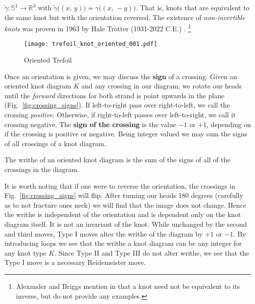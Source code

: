     $\tilde{\gamma}:\mathbb{S}^{1}\rightarrow\mathbb{R}^{3}$ with
    $\tilde{\gamma}\big((x,\,y)\big)=\gamma\big((x,\,-y)\big)$. That is,
    knots that are equivalent to the same knot but with the orientation
    reversed. The existence of \textit{non-invertible knots} was proven in
    1963 by Hale Trotter (1931-2022 C.E.) \cite{TrotterInvertibleKnots1963}.%
    \footnote{%
        Alexander and Briggs mention in \cite[p.~563-564]{AlexanderBriggs1926}
        that a knot need not be equivalent to its inverse, but do not provide
        any examples.
    }
    \par\hfill\par
    \begin{figure}
        \centering
        \texttt{[image: trefoil\_knot\_oriented\_001.pdf]}
        \caption{Oriented Trefoil}
        \label{fig:trefoil_knot_oriented_001}
    \end{figure}
    Once an orientation is given, we may discuss the \textbf{sign} of a
    crossing. Given an oriented knot diagram $K$ and any crossing in our
    diagram, we rotate our heads until the \textit{forward} directions for
    both strand is point upwards in the plane
    (Fig.~\ref{fig:crossing_signs}). If left-to-right pass over
    right-to-left, we call the crossing \textit{positive}. Otherwise,
    if right-to-left passes over left-to-right, we call it crossing
    negative. The \textbf{sign of the crossing} is the value $-1$ or $+1$,
    depending on if the crossing is positive or negative. Being integer valued
    we may sum the signs of all crossings of a knot diagram.
    \begin{definition}
        The writhe of an oriented knot diagram is the sum of the signs of all
        of the crossings in the diagram.
    \end{definition}
    It is worth noting that if one were to reverse the orientation, the
    crossings in Fig.~\ref{fig:crossing_signs} will flip. After turning our
    heads 180 degrees (carefully as to not fracture ones neck) we will
    find that the image does not change. Hence the writhe is independent of
    the orientation and is dependent only on the knot diagram itself. It is
    not an invariant of the knot. While unchanged by the second and third
    moves, Type I moves alter the writhe of the diagram by $+1$ or
    $-1$. By introducing loops we see that the writhe a knot diagram can be
    any integer for any knot type $K$. Since Type II and Type III do not alter
    writhe, we see that the Type I move is a necessary Reidemeister move.

